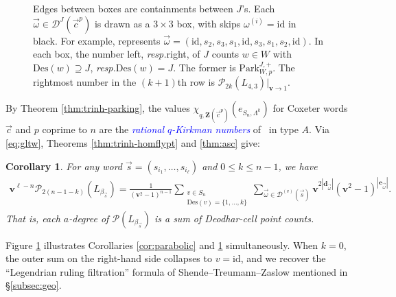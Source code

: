 \documentclass[submission]{FPSAC2025}
\newtheorem{cor}{Corollary}
\newcommand{\dfemph}[1]{\textcolor{blue}{\emph{#1}}}
\newcommand{\id}{\mathrm{id}}
\newcommand{\m}{p}
\newcommand{\x}{\mathbf{v}}
\newcommand{\Des}{\mathrm{Des}}
\newcommand{\HOMFLYPT}{\mathcal{P}}
\newcommand{\CharQ}[1]{\chi_{q, #1}}
\newcommand{\Park}{\mathrm{Park}}
\begin{document}
\begin{figure}[htb]
{Edges between boxes are containments between $J$'s.
Each $\vec{\omega} \in \mathcal{D}^J(\vec{c}^\m)$
is drawn as a $3 \times 3$ box, with skips $\omega^{(i)} = \id$ in black.
For example, \raisebox{-5pt}{\captionfig} represents $\vec{\omega} = (\id, s_2, s_3, s_1, \id, s_3, s_1, s_2, \id)$.
In each box, the number left, \emph{resp.}\@ right, of $J$ counts $w \in W$ with $\Des(w) \supseteq J$, \emph{resp.}\@ $\Des(w) = J$.
The former is $\Park_{W, \m}^{J, +}$.
The rightmost number in the $(k + 1)$th row is $\HOMFLYPT_{2k}(L_{4, 3})|_{\x \to 1}$.}
\label{fig:a3p3}
\end{figure}


By Theorem \ref{thm:trinh-parking}, the values $\CharQ{\mathbf{Z}(\vec{c}^\m)}(e_{S_n, \Lambda^k})$ for Coxeter words $\vec{c}$ and $\m$ coprime to $n$ are the \dfemph{rational $q$-Kirkman numbers} of~\cite{rss} in type $A$.
Via \eqref{eq:gltw}, Theorems \ref{thm:trinh-homflypt} and \ref{thm:asc} give:

\begin{cor}\label{cor:a-degree}
For any word $\vec{s} = (s_{i_1}, \ldots, s_{i_\ell})$ and $0 \leq k \leq n - 1$, we have
\begin{align}
\x^{\ell - n}
\HOMFLYPT_{2(n - 1 - k)}(L_{\beta_{\vec{s}}})
	= \frac{1}{(\x^2 - 1)^{n - 1}}
		\sum_{\substack{v \in S_n \\ \Des(v) = \{1, \ldots, k\}}}
		\sum_{\vec{\omega} \in \mathcal{D}^{(v)}(\vec{s})}
			\x^{2|\mathbf{d}_{\vec{\omega}}|} 
			(\x^2 - 1)^{|\mathbf{e}_{\vec{\omega}}|}.
\end{align}
That is, each $a$-degree of $\HOMFLYPT(L_{\beta_{\vec{s}}})$ is a sum of Deodhar-cell point counts.
\end{cor}

Figure \ref{fig:a3p3} illustrates Corollaries \ref{cor:parabolic} and \ref{cor:a-degree} simultaneously.
When $k = 0$, the outer sum on the right-hand side collapses to $v = \id$, and we recover the ``Legendrian ruling filtration'' formula of Shende--Treumann--Zaslow mentioned in \S\ref{subsec:geo}.
\end{document}
